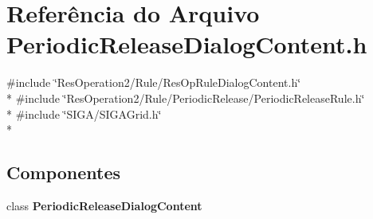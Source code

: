 \section{Referência do Arquivo Periodic\+Release\+Dialog\+Content.\+h}
\label{_2_rule_2_periodic_release_2_periodic_release_dialog_content_8h}
{\ttfamily \#include \char`\"{}Res\+Operation2/\+Rule/\+Res\+Op\+Rule\+Dialog\+Content.\+h\char`\"{}}\\*
{\ttfamily \#include \char`\"{}Res\+Operation2/\+Rule/\+Periodic\+Release/\+Periodic\+Release\+Rule.\+h\char`\"{}}\\*
{\ttfamily \#include \char`\"{}S\+I\+G\+A/\+S\+I\+G\+A\+Grid.\+h\char`\"{}}\\*
\subsection*{Componentes}
\begin{DoxyCompactItemize}
\item 
class {\bf Periodic\+Release\+Dialog\+Content}
\end{DoxyCompactItemize}
